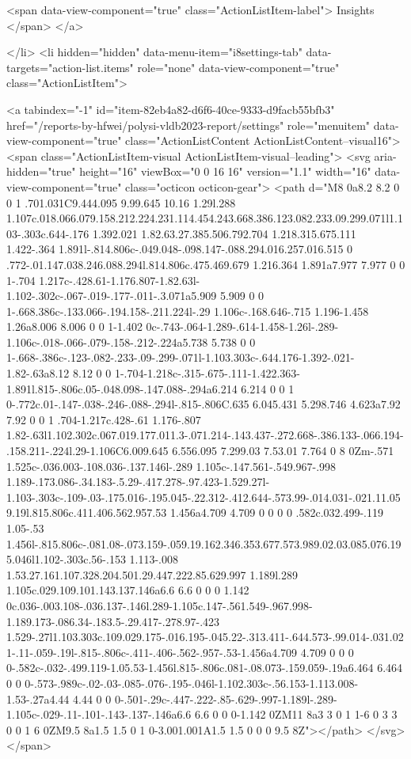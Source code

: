 {{        <span data-view-component="true" class="ActionListItem-label">
          Insights
</span>      
</a>
  
</li>
        <li hidden="hidden" data-menu-item="i8settings-tab" data-targets="action-list.items" role="none" data-view-component="true" class="ActionListItem">
    
    
    <a tabindex="-1" id="item-82eb4a82-d6f6-40ce-9333-d9facb55bfb3" href="/reports-by-hfwei/polysi-vldb2023-report/settings" role="menuitem" data-view-component="true" class="ActionListContent ActionListContent--visual16">
        <span class="ActionListItem-visual ActionListItem-visual--leading">
          <svg aria-hidden="true" height="16" viewBox="0 0 16 16" version="1.1" width="16" data-view-component="true" class="octicon octicon-gear">
    <path d="M8 0a8.2 8.2 0 0 1 .701.031C9.444.095 9.99.645 10.16 1.29l.288 1.107c.018.066.079.158.212.224.231.114.454.243.668.386.123.082.233.09.299.071l1.103-.303c.644-.176 1.392.021 1.82.63.27.385.506.792.704 1.218.315.675.111 1.422-.364 1.891l-.814.806c-.049.048-.098.147-.088.294.016.257.016.515 0 .772-.01.147.038.246.088.294l.814.806c.475.469.679 1.216.364 1.891a7.977 7.977 0 0 1-.704 1.217c-.428.61-1.176.807-1.82.63l-1.102-.302c-.067-.019-.177-.011-.3.071a5.909 5.909 0 0 1-.668.386c-.133.066-.194.158-.211.224l-.29 1.106c-.168.646-.715 1.196-1.458 1.26a8.006 8.006 0 0 1-1.402 0c-.743-.064-1.289-.614-1.458-1.26l-.289-1.106c-.018-.066-.079-.158-.212-.224a5.738 5.738 0 0 1-.668-.386c-.123-.082-.233-.09-.299-.071l-1.103.303c-.644.176-1.392-.021-1.82-.63a8.12 8.12 0 0 1-.704-1.218c-.315-.675-.111-1.422.363-1.891l.815-.806c.05-.048.098-.147.088-.294a6.214 6.214 0 0 1 0-.772c.01-.147-.038-.246-.088-.294l-.815-.806C.635 6.045.431 5.298.746 4.623a7.92 7.92 0 0 1 .704-1.217c.428-.61 1.176-.807 1.82-.63l1.102.302c.067.019.177.011.3-.071.214-.143.437-.272.668-.386.133-.066.194-.158.211-.224l.29-1.106C6.009.645 6.556.095 7.299.03 7.53.01 7.764 0 8 0Zm-.571 1.525c-.036.003-.108.036-.137.146l-.289 1.105c-.147.561-.549.967-.998 1.189-.173.086-.34.183-.5.29-.417.278-.97.423-1.529.27l-1.103-.303c-.109-.03-.175.016-.195.045-.22.312-.412.644-.573.99-.014.031-.021.11.059.19l.815.806c.411.406.562.957.53 1.456a4.709 4.709 0 0 0 0 .582c.032.499-.119 1.05-.53 1.456l-.815.806c-.081.08-.073.159-.059.19.162.346.353.677.573.989.02.03.085.076.195.046l1.102-.303c.56-.153 1.113-.008 1.53.27.161.107.328.204.501.29.447.222.85.629.997 1.189l.289 1.105c.029.109.101.143.137.146a6.6 6.6 0 0 0 1.142 0c.036-.003.108-.036.137-.146l.289-1.105c.147-.561.549-.967.998-1.189.173-.086.34-.183.5-.29.417-.278.97-.423 1.529-.27l1.103.303c.109.029.175-.016.195-.045.22-.313.411-.644.573-.99.014-.031.021-.11-.059-.19l-.815-.806c-.411-.406-.562-.957-.53-1.456a4.709 4.709 0 0 0 0-.582c-.032-.499.119-1.05.53-1.456l.815-.806c.081-.08.073-.159.059-.19a6.464 6.464 0 0 0-.573-.989c-.02-.03-.085-.076-.195-.046l-1.102.303c-.56.153-1.113.008-1.53-.27a4.44 4.44 0 0 0-.501-.29c-.447-.222-.85-.629-.997-1.189l-.289-1.105c-.029-.11-.101-.143-.137-.146a6.6 6.6 0 0 0-1.142 0ZM11 8a3 3 0 1 1-6 0 3 3 0 0 1 6 0ZM9.5 8a1.5 1.5 0 1 0-3.001.001A1.5 1.5 0 0 0 9.5 8Z"></path>
</svg>
        </span>
      
}}
